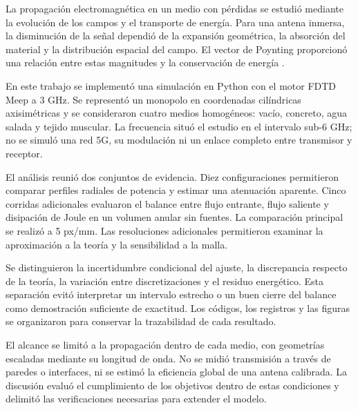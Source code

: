 La propagación electromagnética en un medio con pérdidas se estudió mediante la evolución de los campos y el transporte de energía. Para una antena inmersa, la disminución de la señal dependió de la expansión geométrica, la absorción del material y la distribución espacial del campo. El vector de Poynting proporcionó una relación entre estas magnitudes y la conservación de energía \citep{Griffiths2017,Poynting1884}.

En este trabajo se implementó una simulación en Python con el motor FDTD Meep a 3 GHz. Se representó un monopolo en coordenadas cilíndricas axisimétricas y se consideraron cuatro medios homogéneos: vacío, concreto, agua salada y tejido muscular. La frecuencia situó el estudio en el intervalo sub-6 GHz; no se simuló una red 5G, su modulación ni un enlace completo entre transmisor y receptor.

El análisis reunió dos conjuntos de evidencia. Diez configuraciones permitieron comparar perfiles radiales de potencia y estimar una atenuación aparente. Cinco corridas adicionales evaluaron el balance entre flujo entrante, flujo saliente y disipación de Joule en un volumen anular sin fuentes. La comparación principal se realizó a 5 px/mm. Las resoluciones adicionales permitieron examinar la aproximación a la teoría y la sensibilidad a la malla.

Se distinguieron la incertidumbre condicional del ajuste, la discrepancia respecto de la teoría, la variación entre discretizaciones y el residuo energético. Esta separación evitó interpretar un intervalo estrecho o un buen cierre del balance como demostración suficiente de exactitud. Los códigos, los registros y las figuras se organizaron para conservar la trazabilidad de cada resultado.

El alcance se limitó a la propagación dentro de cada medio, con geometrías escaladas mediante su longitud de onda. No se midió transmisión a través de paredes o interfaces, ni se estimó la eficiencia global de una antena calibrada. La discusión evaluó el cumplimiento de los objetivos dentro de estas condiciones y delimitó las verificaciones necesarias para extender el modelo.
